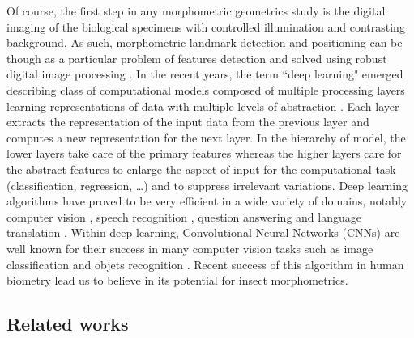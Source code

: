 \documentclass[review]{elsarticle}
\begin{document}
 
Of course, the first step in any morphometric geometrics study is the digital imaging of the biological specimens with controlled illumination and contrasting background. As such, morphometric landmark detection and positioning can be though as a particular problem of features detection and solved using robust digital image processing \cite{gonzalez_digital_2006}. In the recent years, the term ``deep learning" emerged describing class of computational models composed of multiple processing layers learning representations of data with multiple levels of abstraction \cite{lecun2015deep}. Each layer extracts the representation of the input data from the previous layer and computes a new representation for the next layer. In the hierarchy of model, the lower layers take care of the primary features whereas the higher layers care for the abstract features to enlarge the aspect of input for the computational task (classification, regression, \ldots) and to suppress irrelevant variations. Deep learning algorithms have proved to be very efficient in a wide variety of domains, notably computer vision \cite{krizhevsky2012imagenet, ciregan2012multi, szegedy2015going, li2015convolutional,tompson2014joint}, speech recognition \cite{mikolov2011strategies, hinton2012deep, sainath2013deep}, question answering \cite{bordes2014question} and language translation \cite{sutskever2014sequence, jean2014using}.
Within deep learning, Convolutional Neural Networks (CNNs) are well known for their success in many computer vision tasks such as image classification \cite{krizhevsky2012imagenet,ciregan2012multi} and  objets recognition \cite{li2015convolutional,tompson2014joint}.
Recent success of this algorithm in human biometry \cite{cintas2016automatic} lead us to believe in its potential for insect morphometrics.  


\subsection{Related works}\label{rw}
\end{document}
